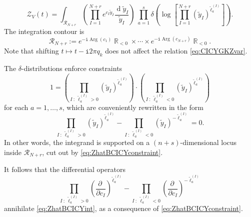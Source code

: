 \documentclass[12pt,a4paper,oneside]{amsart}
\numberwithin{equation}{section}
\theoremstyle{definition}
\theoremstyle{remark}
\DeclareMathOperator{\R}{\mathbb{R}}
\DeclareMathOperator{\dd}{d}
\DeclareMathOperator{\Arg}{Arg}
\newcommand{\mz}{\mathcal{Z}}
\newcommand{\ii}{\mathtt{i}}
\begin{document}
\begin{appendix}
\begin{equation}
\label{eq:ZhatBCICYint}
	\mz_{V} \left( t \right)  = \int_{\mathcal{R}_{N+r}} \left( \prod_{I=1}^{N+r} e^{c_I\tilde{y}_I}  \frac{\dd \tilde{y}_I}{\tilde{y}_I} \right) ~ \prod_{a=1}^{s} \delta \left( \log  \left[ \prod_{I=1}^{N+r} (\tilde{y}_I)^{\tilde{\ell}_a^{(I)}} \right] \right) .
\end{equation}
The integration contour is 
\begin{equation*}
	\mathcal{R}_{N+r} := e^{- \ii \Arg (c_1)} \R_{< 0} \times \cdots \times e^{- \ii \Arg (c_{N+r})} \R_{< 0} .
\end{equation*}
Note that shifting $t \mapsto t - \ii 2 \pi q_k$ does not affect the relation \eqref{eq:CICYGKZvar}.\par
\medskip
The $\delta$-distributions enforce constraints 
\begin{equation*}
	 1= \left( \prod_{I \ : \ \tilde{\ell}_a ^{(I)} >0} ( \tilde{y}_I)^{ \tilde{\ell}_a ^{(I)}} \right) \cdot \left( \prod_{I \ : \ \tilde{\ell}_a ^{(I)} <0} ( \tilde{y}_I)^{ \tilde{\ell}_a ^{(I)}} \right)
\end{equation*}
for each $a=1, \dots, s$, which are conveniently rewritten in the form 
\begin{equation}
\label{eq:ZhatBCICYconstraint}
	\prod_{I \ : \ \tilde{\ell}_a ^{(I)} >0} ( \tilde{y}_I)^{ \tilde{\ell}_a ^{(I)}} - \prod_{I \ : \ \tilde{\ell}_a ^{(I)} <0} ( \tilde{y}_I)^{ - \tilde{\ell}_a ^{(I)}} =0 .
\end{equation}
In other words, the integrand is supported on a $(n+s)$-dimensional locus inside $\mathcal{R}_{N+r}$, cut out by \eqref{eq:ZhatBCICYconstraint}.\par
It follows that the differential operators 
\begin{equation*}
	\prod_{I \ : \ \tilde{\ell}_a ^{(I)} >0}  \left( \frac{\partial \ }{\partial c_I} \right)^{ \tilde{\ell}_a ^{(I)}} - \prod_{I \ : \ \tilde{\ell}_a ^{(I)} <0} \left( \frac{\partial \ }{\partial c_I} \right)^{ - \tilde{\ell}_a ^{(I)}  } 
\end{equation*}
annihilate \eqref{eq:ZhatBCICYint}, as a consequence of \eqref{eq:ZhatBCICYconstraint}.



\end{appendix}
\end{document}
